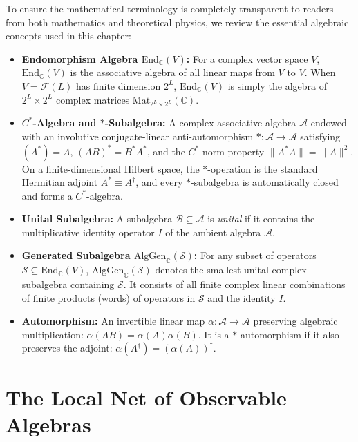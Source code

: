 \begin{remark}
To ensure the mathematical terminology is completely transparent to readers from both mathematics and theoretical physics, we review the essential algebraic concepts used in this chapter:
\begin{itemize}
    \item \textbf{Endomorphism Algebra $\mathrm{End}_{\mathbb{C}}(V)$:} For a complex vector space $V$, $\mathrm{End}_{\mathbb{C}}(V)$ is the associative algebra of all linear maps from $V$ to $V$. When $V = \mathcal{F}(L)$ has finite dimension $2^L$, $\mathrm{End}_{\mathbb{C}}(V)$ is simply the algebra of $2^L \times 2^L$ complex matrices $\mathrm{Mat}_{2^L \times 2^L}(\mathbb{C})$.
    \item \textbf{$C^*$-Algebra and $*$-Subalgebra:} A complex associative algebra $\mathcal{A}$ endowed with an involutive conjugate-linear anti-automorphism $* : \mathcal{A} \to \mathcal{A}$ satisfying $(A^*) = A$, $(A B)^* = B^* A^*$, and the $C^*$-norm property $\|A^* A\| = \|A\|^2$. On a finite-dimensional Hilbert space, the $*$-operation is the standard Hermitian adjoint $A^* \equiv A^\dagger$, and every $*$-subalgebra is automatically closed and forms a $C^*$-algebra.
    \item \textbf{Unital Subalgebra:} A subalgebra $\mathcal{B} \subseteq \mathcal{A}$ is \emph{unital} if it contains the multiplicative identity operator $I$ of the ambient algebra $\mathcal{A}$.
    \item \textbf{Generated Subalgebra $\mathrm{AlgGen}_{\mathbb{C}}(\mathcal{S})$:} For any subset of operators $\mathcal{S} \subseteq \mathrm{End}_{\mathbb{C}}(V)$, $\mathrm{AlgGen}_{\mathbb{C}}(\mathcal{S})$ denotes the smallest unital complex subalgebra containing $\mathcal{S}$. It consists of all finite complex linear combinations of finite products (words) of operators in $\mathcal{S}$ and the identity $I$.
    \item \textbf{Automorphism:} An invertible linear map $\alpha : \mathcal{A} \to \mathcal{A}$ preserving algebraic multiplication: $\alpha(A B) = \alpha(A) \alpha(B)$. It is a $*$-automorphism if it also preserves the adjoint: $\alpha(A^\dagger) = (\alpha(A))^\dagger$.
\end{itemize}
\end{remark}

\section{The Local Net of Observable Algebras}

